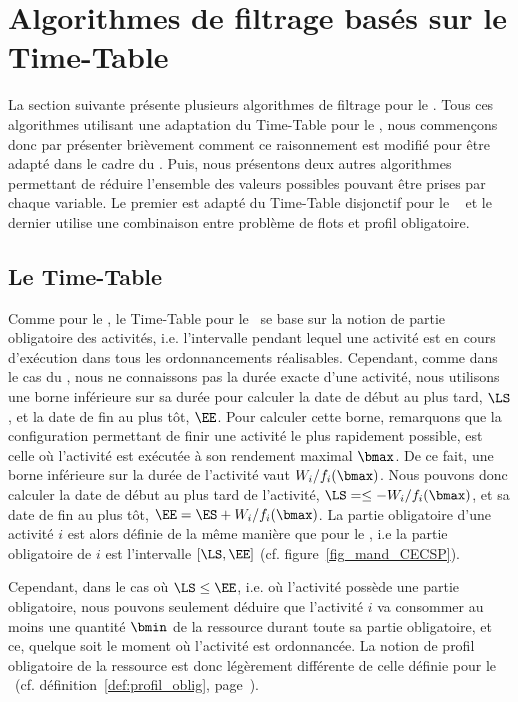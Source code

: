 
\section{Algorithmes de filtrage basés sur le Time-Table}

La section suivante présente plusieurs algorithmes de filtrage pour le
\CECSP. Tous ces algorithmes utilisant une adaptation du Time-Table
pour le \CUSP, nous commençons donc par présenter brièvement comment
ce raisonnement est modifié pour être adapté dans le cadre du \CECSP.
Puis, nous présentons deux autres algorithmes permettant
de réduire l'ensemble des valeurs possibles pouvant être prises par
chaque variable. Le premier est adapté du Time-Table disjonctif pour
le \CUSP~\cite{Gay2015} et le dernier utilise une combinaison entre
problème de flots et profil obligatoire.

\subsection{Le Time-Table}
Comme pour le \CUSP, le Time-Table pour le \CECSP~se base sur la
notion de partie obligatoire des activités, i.e. l'intervalle pendant
lequel une activité est en cours d'exécution dans tous les
ordonnancements réalisables. Cependant, comme dans le cas du \CECSP,
nous ne connaissons pas la durée exacte d'une activité, nous utilisons
une borne inférieure sur sa durée pour calculer la date de début au
plus tard, $\LS$, et la date de fin au plus tôt, $\EE$. Pour calculer
cette borne, remarquons que la configuration permettant de finir une
activité le plus rapidement possible, est celle où l'activité est
exécutée à son rendement maximal $\bmax$. De ce fait, une borne
inférieure sur la durée de l'activité vaut $W_i/f_i(\bmax)$. Nous
pouvons donc calculer la date de début au plus tard de l'activité,
$\LS=\le -W_i/f_i(\bmax)$, et sa date de fin au plus tôt,
$\EE=\ES +W_i/f_i(\bmax)$. La partie obligatoire d'une activité $i$ est
alors définie de la même manière que pour le \CUSP, i.e la partie
obligatoire de $i$ est l'intervalle $[\LS,\EE]$
(cf. figure~\ref{fig_mand_CECSP}).

Cependant, dans le cas où $\LS \le \EE$, i.e. où l'activité possède
une partie obligatoire, nous pouvons seulement déduire que l'activité
$i$ va consommer au moins une quantité $\bmin$ de la ressource durant
toute sa partie obligatoire, et ce, quelque soit le moment où
l'activité est ordonnancée. La notion de profil obligatoire de la
ressource est donc légèrement différente de celle définie pour le
\CUSP~(cf. définition~\ref{def:profil_oblig},
page~\pageref{def:profil_oblig}).

